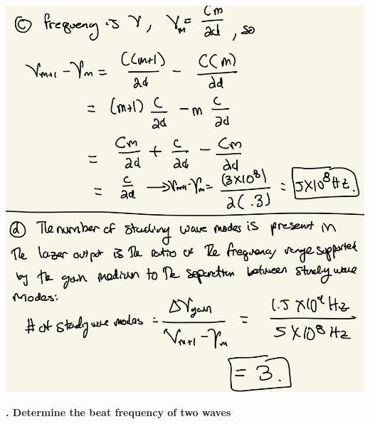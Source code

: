\documentclass[10pt]{article}
\newcounter{counter}
\newcommand*{\question}[1]{
            \textbf{\thecounter. #1} \hfill
            \addtocounter{counter}{1}
            \\ \\
            }
\begin{document}
\begin{center}
    \includegraphics*[scale = .2]{imgs/cavity-example-cont.jpeg}
\end{center}

\question{Determine the beat frequency of two waves}
\end{document}
